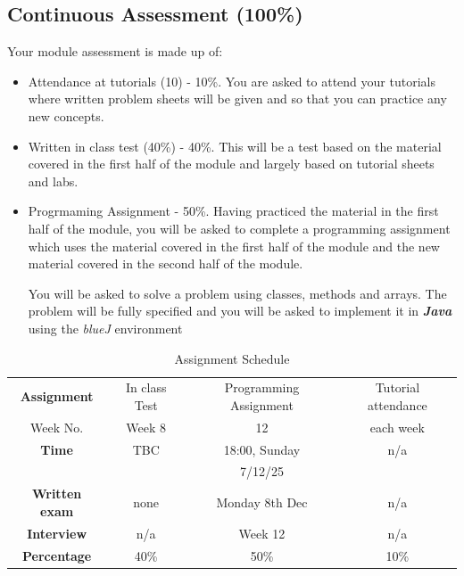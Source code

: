 \documentclass{article}
\begin{document}
\subsection{Continuous Assessment (100\%) }
Your module assessment  is made up of:  
    \begin{itemize}
        \item Attendance at tutorials (10) - 10\%. You are  asked to attend your tutorials where written problem sheets will be given and so that you can practice any new concepts. 
        \item Written in class test (40\%) - 40\%. This will be a test based on the material covered in the first half of the module and largely based on tutorial sheets and labs. 
        \item Progrmaming Assignment  - 50\%. 
        Having practiced the material in the first half of the module, you will be asked to complete a programming assignment which uses the material covered in the first half of the module and the new material covered in the second half of the module.
        
        You will be asked to solve a problem using classes, methods and arrays. The problem will be fully specified and you will be asked to implement it in \textbf{\textit{Java}} using the \textit{blueJ} environment
    \end{itemize}

    \begin{table}
        \begin{center}
    \begin{tabular}{|c |  c  | c | c }
    \hline

     \rowcolor{red!60}
     \textbf{Assignment} &In class Test & Programming Assignment & Tutorial attendance\\  
     \rowcolor{red!30}
     Week No. & Week 8 &  12 & each week   \\ 
      \hline
    
     \rowcolor{red!30}
     \hline
     \textbf{Time} & TBC &  18:00, Sunday & n/a \\ 
 
     \rowcolor{red!30}
    &  & 7/12/25 &  \\ 
     \hline
      \rowcolor{red!35}
     \textbf{Written exam} &none& Monday 8th Dec& n/a \\ 
     \hline
     \rowcolor{red!40}
     \textbf{Interview} &n/a& Week 12 & n/a\\ 
     \hline
     \rowcolor{red!40}
   
     \rowcolor{red!60}
     \textbf{Percentage} &  40\% & 50\%  & 10\% \\ 
     \hline
 
  
    \end{tabular}
    \caption{Assignment Schedule}
    \label{tab:ass-schedule}   
\end{center}
\end{table}
\end{document}
